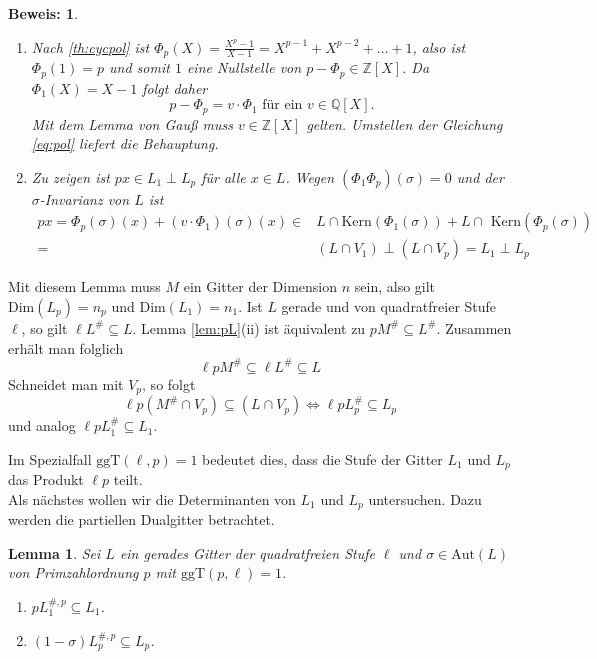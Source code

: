 \documentclass[12pt,a4paper,halfparskip,headsepline,bibtotocnumbered]{scrreprt}
\theoremstyle{nummermitklammern}
\newtheorem{lemma}[defsatzusw]{Lemma}
\theoremstyle{nonumberbreak}
\newtheorem{beweis}{Beweis:}
\newcommand{\Z}{\mathbb{Z}}
\newcommand{\Q}{\mathbb{Q}}
\newcommand{\Kern}{\text{Kern}}
\newcommand{\ggT}{\text{ggT}}
\newcommand{\Aut}{\text{Aut}}
\begin{document}
\begin{beweis}
	\begin{enumerate}[label=(\roman*)]
		\item Nach \eqref{th:cycpol} ist $\Phi_p(X) = \frac{X^p-1}{X-1} = X^{p-1} + X^{p-2} + \dots + 1$, also ist $\Phi_p(1) = p$ und somit $1$ eine Nullstelle von $p - \Phi_p \in \Z\left[ X \right]$. Da $\Phi_1(X) = X-1$ folgt daher 
			\begin{equation}\label{eq:pol}
				p - \Phi_p = v \cdot\Phi_1 \text{ für ein } v \in \Q\left[X\right].
			\end{equation}
			Mit dem Lemma von Gauß muss $v \in \Z \left[ X \right]$ gelten. Umstellen der Gleichung \eqref{eq:pol} liefert die Behauptung.
		\item Zu zeigen ist $p x \in L_1 \perp L_p$ für alle $x \in L$. Wegen $(\Phi_1 \Phi_p)(\sigma) = 0$ und der $\sigma$-Invarianz von $L$ ist
			\begin{align*}
				px = \Phi_p(\sigma)(x) + (v \cdot \Phi_1)(\sigma)(x) \in & L \cap \Kern(\Phi_1(\sigma)) + L \cap\text{ Kern}(\Phi_p(\sigma))\\
				=& (L \cap V_1) \perp (L \cap V_p) = L_1 \perp L_p
			\end{align*}
	\end{enumerate}
\end{beweis}

Mit diesem Lemma muss $M$ ein Gitter der Dimension $n$ sein, also gilt $\text{Dim}(L_p) = n_p$ und $\text{Dim}(L_1) = n_1$. Ist $L$ gerade und von quadratfreier Stufe $\ell$, so gilt $\ell L^\# \subseteq L$. Lemma \eqref{lem:pL}(ii) ist äquivalent zu $p M^\# \subseteq L^\#$. Zusammen erhält man folglich
\begin{equation*}
	\ell p M^\# \subseteq \ell L^\# \subseteq L
\end{equation*}
Schneidet man mit $V_p$, so folgt
\begin{equation*}
	\ell p (M^\# \cap V_p) \subseteq (L \cap V_p) \Leftrightarrow \ell p L_p^\# \subseteq L_p
\end{equation*}
und analog $\ell p L_1^\# \subseteq L_1$.

Im Spezialfall $\ggT(\ell, p) = 1$ bedeutet dies, dass die Stufe der Gitter $L_1$ und $L_p$ das Produkt $\ell p$ teilt.\\
Als nächstes wollen wir die Determinanten von $L_1$ und $L_p$ untersuchen. Dazu werden die partiellen Dualgitter betrachtet.

\begin{framed}
	\begin{lemma}\label{lem:fpinc}
		Sei $L$ ein gerades Gitter der quadratfreien Stufe $\ell$ und $\sigma \in \Aut(L)$ von Primzahlordnung $p$ mit $\ggT(p, \ell) = 1$.
		\begin{enumerate}[label=(\roman*)]
			\item $p L_1^{\#,p} \subseteq L_1$.
			\item $(1 - \sigma)L_p^{\#,p} \subseteq L_p$.
		\end{enumerate}
	\end{lemma}
\end{framed}
\end{document}
